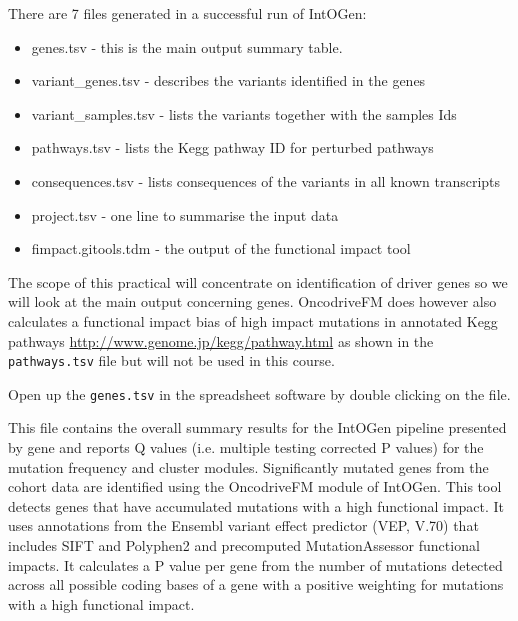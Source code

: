 \begin{information}
There are 7 files generated in a successful run of IntOGen:
\begin{itemize}
 \item genes.tsv - this is the main output summary table.
 \item variant\_genes.tsv - describes the variants identified in the genes
 \item variant\_samples.tsv - lists the variants together with the samples Ids
 \item pathways.tsv - lists the Kegg pathway ID for perturbed pathways
 \item consequences.tsv - lists consequences of the variants in all known transcripts
 \item project.tsv - one line to summarise the input data
 \item fimpact.gitools.tdm - the output of the functional impact tool
\end{itemize}
\end{information}

The scope of this practical will concentrate on identification of driver genes so we
will look at the main output concerning genes. OncodriveFM does however also
calculates a functional impact bias of high impact mutations in annotated Kegg
pathways \url{http://www.genome.jp/kegg/pathway.html} as shown in the
\texttt{pathways.tsv} file but will not be used in this course.

\begin{steps}
Open up the \texttt{genes.tsv} in the spreadsheet software by double clicking on the file.
\end{steps}

\begin{information}
This file contains the overall summary results for the IntOGen pipeline presented by
gene and reports Q values (i.e. multiple testing corrected P values) for the mutation
frequency and cluster modules.
\vspace{4 mm}
Significantly mutated genes from the cohort data are identified using the OncodriveFM
module of IntOGen. This tool detects genes that have accumulated mutations with a
high functional impact. It uses annotations from the Ensembl variant effect predictor
(VEP, V.70) that includes SIFT and Polyphen2 and precomputed MutationAssessor functional
impacts. It calculates a P value per gene from the number of mutations detected across
all possible coding bases of a gene with a positive weighting for mutations with a high
functional impact.
\end{information}

